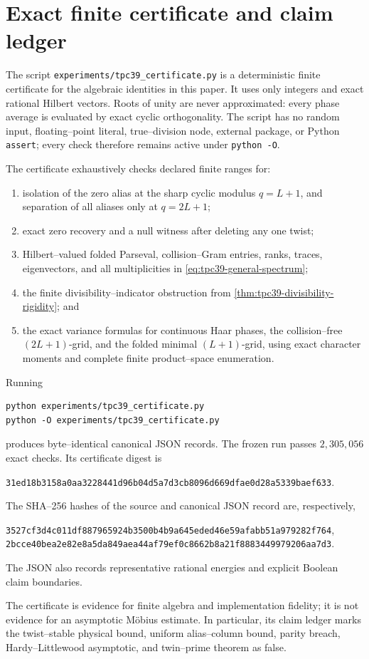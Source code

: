 \section{Exact finite certificate and claim ledger}
\label{sec:tpc39-certificate}

The script \nolinkurl{experiments/tpc39_certificate.py} is a deterministic
finite certificate for the algebraic identities in this paper.  It uses only
integers and exact rational Hilbert vectors.  Roots of unity are never
approximated: every phase average is evaluated by exact cyclic
orthogonality.  The script has no random input, floating--point literal,
true--division node, external package, or Python \texttt{assert}; every check
therefore remains active under \texttt{python -O}.

The certificate exhaustively checks declared finite ranges for:
\begin{enumerate}[label=(\roman*)]
 \item isolation of the zero alias at the sharp cyclic modulus \(q=L+1\),
 and separation of all aliases only at \(q=2L+1\);
 \item exact zero recovery and a null witness after deleting any one twist;
 \item Hilbert--valued folded Parseval, collision--Gram entries, ranks,
 traces, eigenvectors, and all multiplicities in
 \eqref{eq:tpc39-general-spectrum};
 \item the finite divisibility--indicator obstruction from
 \cref{thm:tpc39-divisibility-rigidity}; and
 \item the exact variance formulas for continuous Haar phases, the
 collision--free \((2L+1)\)-grid, and the folded minimal \((L+1)\)-grid,
 using exact character moments and complete finite product--space
 enumeration.
\end{enumerate}

Running
\begin{verbatim}
python experiments/tpc39_certificate.py
python -O experiments/tpc39_certificate.py
\end{verbatim}
produces byte--identical canonical JSON records.  The frozen run passes
\(2{,}305{,}056\) exact checks.  Its certificate digest is
\begin{center}
\nolinkurl{31ed18b3158a0aa3228441d96b04d5a7d3cb8096d669dfae0d28a5339baef633}.
\end{center}
The SHA--256 hashes of the source and canonical JSON record are, respectively,
\begin{center}
\nolinkurl{3527cf3d4c011df887965924b3500b4b9a645eded46e59afabb51a979282f764},\\
\nolinkurl{2bcce40bea2e82e8a5da849aea44af79ef0c8662b8a21f8883449979206aa7d3}.
\end{center}
The JSON also records representative rational energies and explicit Boolean
claim boundaries.

The certificate is evidence for finite algebra and implementation fidelity;
it is not evidence for an asymptotic M\"obius estimate.  In particular, its
claim ledger marks the twist--stable physical bound, uniform alias--column
bound, parity breach, Hardy--Littlewood asymptotic, and twin--prime theorem as
false.
